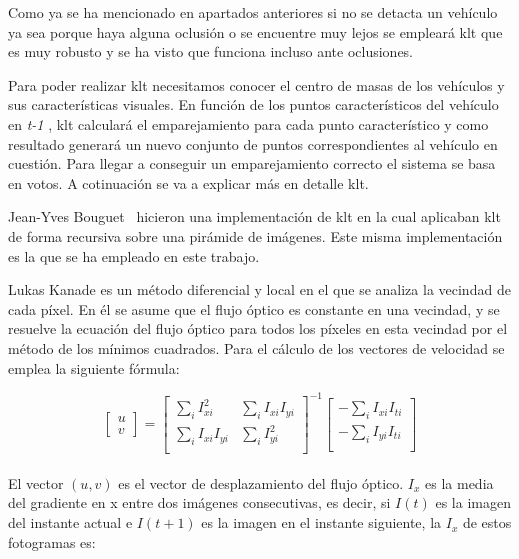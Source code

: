 Como ya se ha mencionado en apartados anteriores si no se detacta un vehículo ya sea porque haya alguna oclusión o se encuentre muy lejos se empleará \acrshort{klt} que es muy robusto y se ha visto que funciona incluso ante oclusiones.

Para poder realizar \acrshort{klt} necesitamos conocer el centro de masas de los vehículos y sus características visuales. En función de los puntos característicos del vehículo en \textit{t-1} , \acrshort{klt} calculará el emparejamiento para cada punto característico y como resultado generará un nuevo conjunto de puntos correspondientes al vehículo en cuestión. Para llegar a conseguir un emparejamiento correcto el sistema se basa en votos. A cotinuación se va a explicar más en detalle \acrshort{klt}.

Jean-Yves Bouguet~\cite{klt_bouguet} hicieron una implementación de \acrshort{klt} en la cual aplicaban \acrshort{klt} de forma recursiva sobre una pirámide de imágenes. Este misma implementación es la que se ha empleado en este trabajo. 

Lukas Kanade es un método diferencial y local en el que se analiza la vecindad de cada píxel. En él se asume que el flujo óptico es constante en una vecindad, y se resuelve la ecuación del flujo
óptico para todos los píxeles en esta vecindad por el método de los mínimos cuadrados. Para el cálculo de los vectores de velocidad se emplea la siguiente fórmula:

\begin{equation}\label{klt_formula}
   \begin{bmatrix}u \\ v\end{bmatrix} = \begin{bmatrix}
            \sum_{i}I_{xi}^2 & \sum_{i}I_{xi}I_{yi} \\
            \sum_{i}I_{xi}I_{yi} &  \sum_{i}I_{yi}^2 \\
\end{bmatrix}^{-1} \begin{bmatrix}
-\sum_{i}I_{xi}I_{ti} \\
-\sum_{i}I_{yi}I_{ti} \\
\end{bmatrix}
\end{equation}
\\

El vector $(u,v)$ es el vector de desplazamiento del flujo óptico.
$I_x$ es la media del gradiente en x entre dos imágenes consecutivas, es decir, si $I(t)$ es la imagen del instante actual e $I(t+1)$ es la imagen en el instante siguiente, la $I_x$ de estos fotogramas es:


